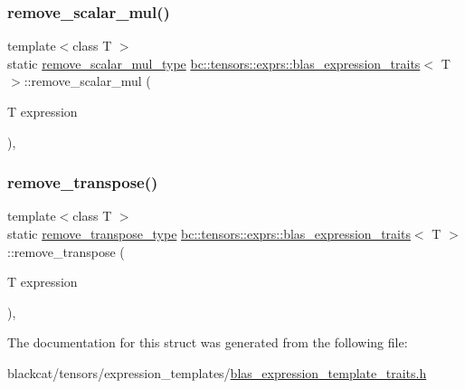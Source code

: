 \mbox{\label{structbc_1_1tensors_1_1exprs_1_1blas__expression__traits_aaa1e5450c4103607193f591f900dbf68}} 
\subsubsection{\texorpdfstring{remove\+\_\+scalar\+\_\+mul()}{remove\_scalar\_mul()}}
{\footnotesize\ttfamily template$<$class T $>$ \\
static \hyperlink{structbc_1_1tensors_1_1exprs_1_1blas__expression__traits_a69dacf887c1ca2cf443865bd4668ccfe}{remove\+\_\+scalar\+\_\+mul\+\_\+type} \hyperlink{structbc_1_1tensors_1_1exprs_1_1blas__expression__traits}{bc\+::tensors\+::exprs\+::blas\+\_\+expression\+\_\+traits}$<$ T $>$\+::remove\+\_\+scalar\+\_\+mul (\begin{DoxyParamCaption}\item[{T}]{expression }\end{DoxyParamCaption})\hspace{0.3cm}{\ttfamily [inline]}, {\ttfamily [static]}}

\mbox{\label{structbc_1_1tensors_1_1exprs_1_1blas__expression__traits_ad14f680b6e3afb078d6d2211ced2e53f}} 
\subsubsection{\texorpdfstring{remove\+\_\+transpose()}{remove\_transpose()}}
{\footnotesize\ttfamily template$<$class T $>$ \\
static \hyperlink{structbc_1_1tensors_1_1exprs_1_1blas__expression__traits_afb08d790861ec86e53b6c53f46fbb826}{remove\+\_\+transpose\+\_\+type} \hyperlink{structbc_1_1tensors_1_1exprs_1_1blas__expression__traits}{bc\+::tensors\+::exprs\+::blas\+\_\+expression\+\_\+traits}$<$ T $>$\+::remove\+\_\+transpose (\begin{DoxyParamCaption}\item[{T}]{expression }\end{DoxyParamCaption})\hspace{0.3cm}{\ttfamily [inline]}, {\ttfamily [static]}}



The documentation for this struct was generated from the following file\+:\begin{DoxyCompactItemize}
\item 
blackcat/tensors/expression\+\_\+templates/\hyperlink{blas__expression__template__traits_8h}{blas\+\_\+expression\+\_\+template\+\_\+traits.\+h}\end{DoxyCompactItemize}
